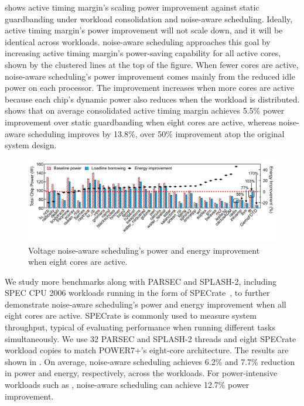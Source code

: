  shows active timing margin's scaling power improvement against static guardbanding under workload consolidation and noise-aware scheduling. Ideally, active timing margin's power improvement will not scale down, and it will be identical across workloads. noise-aware scheduling approaches this goal by increasing active timing margin's power-saving capability for all active cores, shown by the clustered lines at the top of the figure. When fewer cores are active, noise-aware scheduling's power improvement comes mainly from the reduced idle power on each processor. The improvement increases when more cores are active because each chip's dynamic power also reduces when the workload is distributed.  shows that on average consolidated active timing margin achieves 5.5\% power improvement over static guardbanding when eight cores are active, whereas noise-aware scheduling improves by 13.8\%, over 50\% improvement atop the original system design.

\begin{figure}
  \centering
  \includegraphics[trim=0 0 0 0,clip,width=\linewidth]{graphs/voltage/split_benefits_all.pdf}
    \caption{Voltage noise-aware scheduling's power and energy improvement when eight cores are active.}
    \label{fig:ll-borrow-8core-normal}
\end{figure}

We study more benchmarks along with PARSEC and SPLASH-2, including SPEC CPU 2006 workloads running in the form of SPECrate~\cite{SPEC2006}, to further demonstrate noise-aware scheduling's power and energy improvement when all eight cores are active. SPECrate is commonly used to measure system throughput, typical of evaluating performance when running different tasks simultaneously. We use 32 PARSEC and SPLASH-2 threads and eight SPECrate workload copies to match POWER7+'s eight-core architecture. The results are shown in . On average, noise-aware scheduling achieves 6.2\% and 7.7\% reduction in power and energy, respectively, across the workloads. For power-intensive workloads such as , noise-aware scheduling can achieve 12.7\% power improvement. 

